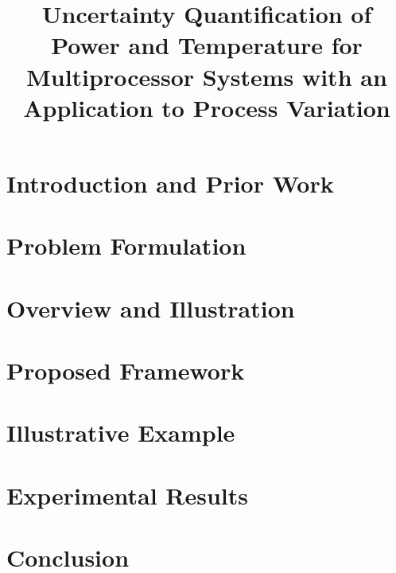 \documentclass{sig-alternate}
\begin{document}
  \title{Uncertainty Quantification of Power and Temperature for Multiprocessor Systems with an Application to Process Variation}

  \maketitle

  \begin{abstract}
    
  \end{abstract}

  \section{Introduction and Prior Work} 
  

  \vspace{-1.0em}
  \section{Problem Formulation}    
  

  \section{Overview and Illustration} 
  

  \section{Proposed Framework} 
  

  \section{Illustrative Example} 
  

  \section{Experimental Results} 
  

  \section{Conclusion} 
  

  \begingroup
  \setlength\bibitemsep{1pt}
  \printbibliography
  \endgroup

  \appendix
  
\end{document}
